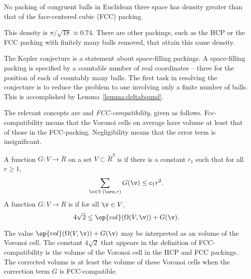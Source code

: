 \begin{theorem} 
\label{theorem:kepler}   
%
No packing of congruent balls in Euclidean three space has density
greater than that of the face-centered cubic (FCC) packing.
\end{theorem}

\begin{remark}
This density is $\pi/\sqrt{18}\approx 0.74$.  There are other
packings, such as the HCP or the FCC
packing with finitely many balls removed, that attain this
same density.
\end{remark}

The Kepler conjecture is a statement about space-filling packings.  A
space-filling packing is specified by a countable number of real
coordinates -- three for the position of each of countably many balls.
The first task in resolving the conjecture is to reduce the problem to
one involving only a finite number of balls.  This is accomplished by
Lemma~\ref{lemma:deltabound}.

The relevant concepts are  and {\it
  FCC-compatibility}, given as follows.  Fcc-compatibility means that
the Voronoi cells on average have volume at least that of those in the
FCC-packing.  Negligibility means that the error term is insignificant.


\begin{definition}\label{def:negligible}
A function $G:V\to \ring{R}$ on a set $V\subset\ring{R}^3$
is 
if there is a constant $c_1$ such that for all $r\ge1$,
\[ \sum_{\v\in V(\orz,r)} G(\v) \le c_1
r^2.\] 
A function $G: V\to\ring{R}$ is
if for all $\v\in V$, 
\[ 4\sqrt{2}\le \op{vol}(\Omega(V,\v)) +
G(\v).\] 
%
%
%
\end{definition}


\begin{remark}
  The value $\op{vol}(\Omega(V,\v)) + G(\v)$ may be interpreted as an
   volume of the Voronoi cell. The constant
  $4\sqrt{2}$ that appears in the definition of FCC-compatibility is
  the volume of the Voronoi cell in the HCP and FCC packings.  The
  corrected volume is at least the volume of these Voronoi cells when
  the correction term $G$ is FCC-compatible.  
%
%
\end{remark}

